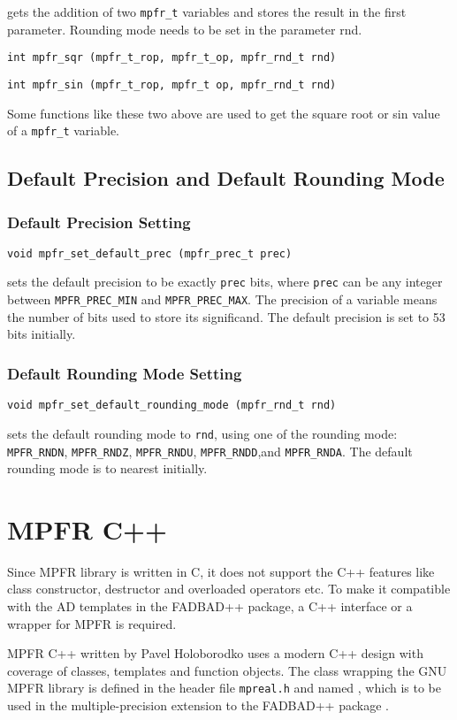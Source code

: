 gets the addition of two {\tt mpfr\_t} variables and stores the result in the first parameter. Rounding mode needs to be set in the parameter rnd.

\texttt{int mpfr\_sqr (mpfr\_t\_rop, mpfr\_t\_op, mpfr\_rnd\_t rnd)}

\texttt{int mpfr\_sin (mpfr\_t\_rop, mpfr\_t op, mpfr\_rnd\_t rnd)}

Some functions like these two above are used to get the square root or sin value of a {\tt mpfr\_t} variable.

\subsection{Default Precision and Default Rounding Mode}
\subsubsection{Default Precision Setting}
\texttt{void mpfr\_set\_default\_prec (mpfr\_prec\_t prec)}

sets the default precision to be exactly \texttt{prec} bits, where \texttt{prec} can be any integer between \texttt{MPFR\_PREC\_MIN} and \texttt{MPFR\_PREC\_MAX}. The precision of a variable means the number of bits used to store its significand. The default precision is set to 53 bits initially.
\subsubsection{Default Rounding Mode Setting}
\texttt{void mpfr\_set\_default\_rounding\_mode (mpfr\_rnd\_t rnd)}

sets the default rounding mode to \texttt{rnd}, using one of the rounding mode: \texttt{MPFR\_RNDN}, \texttt{MPFR\_RNDZ}, \texttt{MPFR\_RNDU}, \texttt{MPFR\_RNDD},and \texttt{MPFR\_RNDA}. The default rounding mode is to nearest initially.

\section{MPFR C++}\label{sc:mpfrcpp}

Since MPFR library is written in C, it does not support the C++ features like class constructor, destructor and overloaded operators etc. To make it compatible with the AD templates in the FADBAD++ package, a C++ interface or a wrapper for MPFR is required.

MPFR C++ written by Pavel Holoborodko uses a modern C++ design with coverage of classes, templates and function objects. The class wrapping the GNU MPFR library is defined in the header file \texttt{mpreal.h} and named \mpreal, which is to be used in the multiple-precision extension to the FADBAD++ package \cite{mpfrcpp}.

